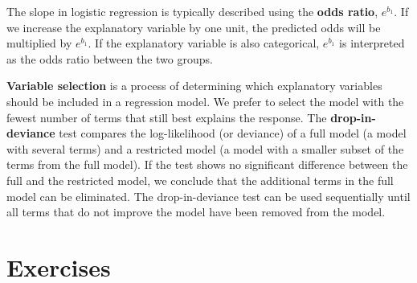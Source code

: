 \documentclass[
]{report}
\begin{document}
The slope in logistic regression is typically described using the \textbf{odds ratio}, \(\scriptstyle e^{b_1}\). If we increase the explanatory variable by one unit, the predicted odds will be multiplied by \(\scriptstyle e^{b_1}\). If the explanatory variable is also categorical, \(\scriptstyle e^{b_1}\) is interpreted as the odds ratio between the two groups.

\textbf{Variable selection} is a process of determining which explanatory variables should be included in a regression model. We prefer to select the model with the fewest number of terms that still best explains the response. The \textbf{drop-in-deviance} test compares the log-likelihood (or deviance) of a full model (a model with several terms) and a restricted model (a model with a smaller subset of the terms from the full model). If the test shows no significant difference between the full and the restricted model, we conclude that the additional terms in the full model can be eliminated. The drop-in-deviance test can be used sequentially until all terms that do not improve the model have been removed from the model.

\hypertarget{exercises-5}{%
\section{Exercises}\label{exercises-5}}
\end{document}
